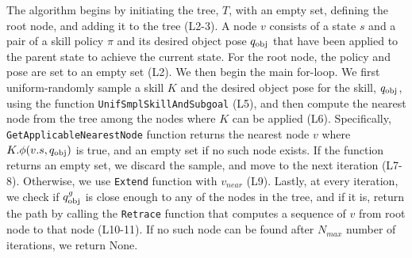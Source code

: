 The algorithm begins by initiating the tree, $T$, with an empty set, defining the root node, and adding it to the tree (L2-3). A node $v$ consists of a state $s$ and a pair of a skill policy $\pi$ and its desired object pose $q_\text{obj}$ that have been applied to the parent state to achieve the current state. For the root node, the policy and pose are set to an empty set (L2). We then begin the main for-loop. We first uniform-randomly sample a skill $K$ and the desired object pose for the skill, $q_\text{obj}$, using the function \texttt{UnifSmplSkillAndSubgoal} (L5), and then compute the nearest node from the tree among the nodes where $K$ can be applied (L6). Specifically, \texttt{GetApplicableNearestNode} function returns the nearest node $v$ where $K.\phi(v.s, \qobj)$ is true, and an empty set if no such node exists. If the function returns an empty set, we discard the sample, and move to the next iteration (L7-8). Otherwise, we use \texttt{Extend} function with $v_{near}$ (L9). Lastly, at every iteration, we check if $q_\text{obj}^g$ is close enough to any of the nodes in the tree, and if it is, return the path by calling the \texttt{Retrace} function that computes a sequence of $v$ from root node to that node (L10-11). If no such node can be found after $N_{max}$ number of iterations, we return None. 

\iffalse
\begin{algorithm}[H]
\caption{\texttt{GetFeasibleNearestNode}($T, K, \qobj,\texttt{Dist})$}\label{algo:NearestNode}
\begin{algorithmic}[1]
    \State $V_{\text{sorted}} \gets \texttt{SortBy}(T.V, \qobj, \texttt{Dist})$
    \For{$v$ in $V_\text{near}$}
        \If{$K.\phi(v.s, \qobj)$} \Comment{Checks applicability}
            \State \Return $v$
        \EndIf
    \EndFor
    \State \Return $\emptyset$
\end{algorithmic}
\end{algorithm}
\fi

